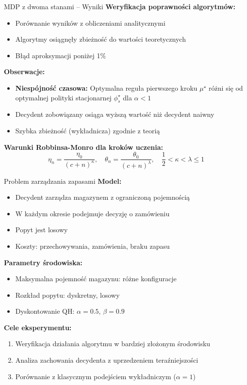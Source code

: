 \begin{frame}{MDP z dwoma stanami -- Wyniki}
\textbf{Weryfikacja poprawności algorytmów:}

\begin{itemize}
    \item Porównanie wyników z obliczeniami analitycznymi
    \item Algorytmy osiągnęły zbieżność do wartości teoretycznych
    \item Błąd aproksymacji poniżej 1\%
\end{itemize}

\vspace{0.5em}
\textbf{Obserwacje:}
\begin{itemize}
    \item \textbf{Niespójność czasowa:} Optymalna reguła pierwszego kroku $\mu^\star$ różni się od optymalnej polityki stacjonarnej $\phi_s^\star$ dla $\alpha < 1$
    \item Decydent zobowiązany osiąga wyższą wartość niż decydent naiwny
    \item Szybka zbieżność (wykładnicza) zgodnie z teorią
\end{itemize}

\vspace{0.5em}
\textbf{Warunki Robbinsa-Monro dla kroków uczenia:}
\[
\eta_n = \frac{\eta_0}{(c + n)^{\kappa}}, \quad
\theta_n = \frac{\theta_0}{(c + n)^{\lambda}}, \quad
\frac{1}{2} < \kappa < \lambda \le 1
\]
\end{frame}

\begin{frame}{Problem zarządzania zapasami}
\textbf{Model:}
\begin{itemize}
    \item Decydent zarządza magazynem z ograniczoną pojemnością
    \item W każdym okresie podejmuje decyzję o zamówieniu
    \item Popyt jest losowy
    \item Koszty: przechowywania, zamówienia, braku zapasu
\end{itemize}

\vspace{0.5em}
\textbf{Parametry środowiska:}
\begin{itemize}
    \item Maksymalna pojemność magazynu: różne konfiguracje
    \item Rozkład popytu: dyskretny, losowy
    \item Dyskontowanie QH: $\alpha = 0.5$, $\beta = 0.9$
\end{itemize}

\vspace{0.5em}
\textbf{Cele eksperymentu:}
\begin{enumerate}
    \item Weryfikacja działania algorytmu w bardziej złożonym środowisku
    \item Analiza zachowania decydenta z uprzedzeniem teraźniejszości
    \item Porównanie z klasycznym podejściem wykładniczym ($\alpha = 1$)
\end{enumerate}
\end{frame}

